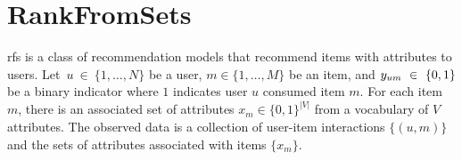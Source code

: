 \section{RankFromSets}
\label{sec:rankfromsets}
\acrfull{rfs} is a class of recommendation models that recommend items with attributes to users. Let~$u~\in~\{1, \ldots, N\}$ be a user, $m \in \{1, \ldots, M\}$ be an item, and $y_{um}~\in~\{0,1\}$ be a binary indicator where $1$ indicates user $u$ consumed item $m$. For each item $m$, there is an associated set of attributes $x_m \in \{0,1\}^{|V|}$ from a vocabulary of $V$ attributes. The observed data is a collection of user-item interactions $\{(u, m)\}$ and the sets of attributes associated with items $\{x_m\}$.

